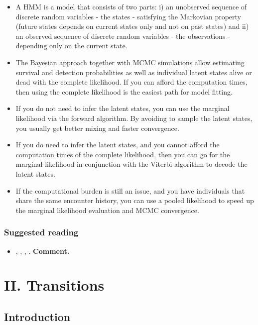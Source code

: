 \documentclass[
  12pt,
]{krantz}
\providecommand{\tightlist}{%
  \setlength{\itemsep}{0pt}\setlength{\parskip}{0pt}}
\begin{document}
\begin{itemize}
\item
  A HMM is a model that consists of two parts: i) an unobserved sequence of discrete random variables - the states - satisfying the Markovian property (future states depends on current states only and not on past states) and ii) an observed sequence of discrete random variables - the observations - depending only on the current state.
\item
  The Bayesian approach together with MCMC simulations allow estimating survival and detection probabilities as well as individual latent states alive or dead with the complete likelihood. If you can afford the computation times, then using the complete likelihood is the easiest path for model fitting.
\item
  If you do not need to infer the latent states, you can use the marginal likelihood via the forward algorithm. By avoiding to sample the latent states, you usually get better mixing and faster convergence.
\item
  If you do need to infer the latent states, and you cannot afford the computation times of the complete likelihood, then you can go for the marginal likelihood in conjunction with the Viterbi algorithm to decode the latent states.
\item
  If the computational burden is still an issue, and you have individuals that share the same encounter history, you can use a pooled likelihood to speed up the marginal likelihood evaluation and MCMC convergence.
\end{itemize}

\hypertarget{suggested-reading-2}{%
\section{Suggested reading}\label{suggested-reading-2}}

\begin{itemize}
\tightlist
\item
  \citet{JurafskySpeechAL}, \citet{mcclintock_uncovering_2020}, \citet{Rabiner1989}, \citet{ZucchiniEtAl2016}. \textbf{Comment.}
\end{itemize}

\hypertarget{part-ii.-transitions}{%
\part{II. Transitions}\label{part-ii.-transitions}}

\hypertarget{introduction-4}{%
\chapter*{Introduction}\label{introduction-4}}
\end{document}
